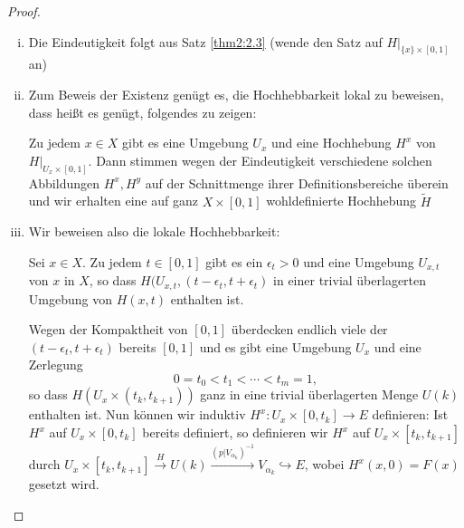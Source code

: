 \documentclass[a4paper,10pt]{scrartcl}
\begin{document}
\begin{proof}
 \begin{enumerate}[(i)]
  \item Die Eindeutigkeit folgt aus Satz \ref{thm2:2.3} (wende den Satz auf $H|_{\{x\}\times[0,1]}$ an)
  \item Zum Beweis der Existenz genügt es, die Hochhebbarkeit lokal zu beweisen, dass heißt es genügt, folgendes zu zeigen:
\setcounter{figure}{72} %
\begin{figure}[H]
\centering
 \fixme[fig73]
\caption{}
\end{figure}
Zu jedem $x\in X$ gibt es eine Umgebung $U_x$ und eine Hochhebung $H^x$ von $H|_{U_x\times[0,1]}$. Dann stimmen wegen der Eindeutigkeit verschiedene solchen Abbildungen $H^x, H^y$ auf der Schnittmenge ihrer Definitionsbereiche überein und wir erhalten eine auf ganz $X \times[0,1]$ wohldefinierte Hochhebung $\tilde H$
\item Wir beweisen also die lokale Hochhebbarkeit: 

Sei $x\in X$. Zu jedem $t\in[0,1]$ gibt es ein $\epsilon_t>0$ und eine Umgebung $U_{x,t}$ von $x$ in $X$, so dass $H(U_{x,t}, (t-\epsilon_t, t+ \epsilon_t)$ in einer trivial überlagerten Umgebung von $H(x,t)$ enthalten ist.

Wegen der Kompaktheit von $[0,1]$ überdecken endlich viele der $(t-\epsilon_t, t+\epsilon_t)$ bereits $[0,1]$ und es gibt eine Umgebung $U_x$ und eine Zerlegung
\[
 0=t_0<t_1<\dotsb <t_m=1,
\]
so dass $H(U_x\times (t_k, t_{k+1}))$ ganz in eine trivial überlagerten Menge $U(k)$ enthalten ist. Nun können wir induktiv $H^x: U_{x}\times [0,t_k] \to E$ definieren: Ist $H^x$ auf $U_x\times [0,t_k]$ bereits definiert, so definieren wir $H^x$ auf $U_x\times[t_k,t_{k+1}]$ durch $U_x\times [t_k, t_{k+1}]\stackrel{H}{\to} U(k) \stackrel{(p|V_{\alpha_k})^{-1}}\to V_{\alpha_k}\hookrightarrow E$, wobei $H^x(x,0)=F(x)$ gesetzt wird.
 \end{enumerate}

\end{proof}
\end{document}
